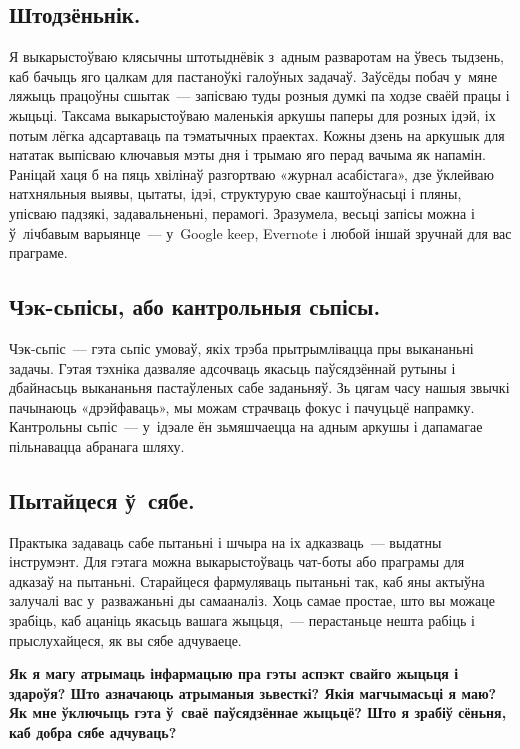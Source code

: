 
\subsection*{Штодзёньнік.}

Я выкарыстоўваю клясычны штотыднёвік з~адным разваротам на ўвесь тыдзень, каб бачыць яго цалкам для пастаноўкі галоўных задачаў. Заўсёды побач у~мяне ляжыць працоўны сшытак~--- запісваю туды розныя думкі па ходзе сваёй працы і жыцьці. Таксама выкарыстоўваю маленькія аркушы паперы для розных ідэй, іх потым лёгка адсартаваць па тэматычных праектах. Кожны дзень на аркушык для нататак выпісваю ключавыя мэты дня і трымаю яго перад вачыма як напамін. Раніцай хаця б на пяць хвілінаў разгортваю «журнал асабістага», дзе ўклейваю натхняльныя выявы, цытаты, ідэі, структурую свае каштоўнасьці і пляны, упісваю падзякі, задавальненьні, перамогі. Зразумела, весьці запісы можна і ў~лічбавым варыянце~--- у~Google keep, Evernote і любой іншай зручнай для вас праграме.

\subsection*{Чэк-сьпісы, або кантрольныя сьпісы.}

Чэк-сьпіс~--- гэта сьпіс умоваў, якіх трэба прытрымлівацца пры выкананьні задачы. Гэтая тэхніка дазваляе адсочваць якасьць паўсядзённай рутыны і дбайнасьць выкананьня пастаўленых сабе заданьняў. Зь цягам часу нашыя звычкі пачынаюць «дрэйфаваць», мы можам страчваць фокус і пачуцьцё напрамку. Кантрольны сьпіс~--- у~ідэале ён зьмяшчаецца на адным аркушы і дапамагае пільнавацца абранага шляху.

\subsection*{Пытайцеся ў~сябе.}

Практыка задаваць сабе пытаньні і шчыра на іх адказваць~--- выдатны інструмэнт. Для гэтага можна выкарыстоўваць чат-боты або праграмы для адказаў на пытаньні. Старайцеся фармуляваць пытаньні так, каб яны актыўна залучалі вас у~разважаньні ды самааналіз. Хоць самае простае, што вы можаце зрабіць, каб ацаніць якасьць вашага жыцьця,~--- перастаньце нешта рабіць і прыслухайцеся, як вы сябе адчуваеце. 

\textbf{Як я магу атрымаць інфармацыю пра гэты аспэкт свайго жыцьця і здароўя? Што азначаюць атрыманыя зьвесткі? Якія магчымасьці я маю? Як мне ўключыць гэта ў~сваё паўсядзённае жыцьцё? Што я зрабіў сёньня, каб добра сябе адчуваць?}

